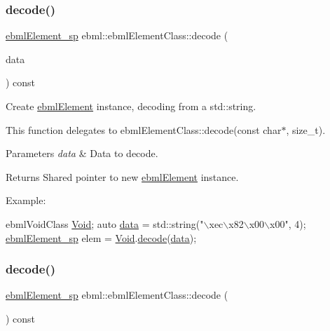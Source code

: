 \subsubsection{\texorpdfstring{decode()}{decode()}\hspace{0.1cm}{\footnotesize\ttfamily [4/10]}}
{\footnotesize\ttfamily \mbox{\hyperlink{namespaceebml_adad533b7705a16bb360fe56380c5e7be}{ebml\+Element\+\_\+sp}} ebml\+::ebml\+Element\+Class\+::decode (\begin{DoxyParamCaption}\item[{const std\+::string \&}]{data }\end{DoxyParamCaption}) const}

Create \mbox{\hyperlink{classebml_1_1ebmlElement}{ebml\+Element}} instance, decoding from a std\+::string.

This function delegates to ebml\+Element\+Class\+::decode(const char$\ast$, size\+\_\+t).


\begin{DoxyParams}{Parameters}
{\em data} & Data to decode. \\
\hline
\end{DoxyParams}
\begin{DoxyReturn}{Returns}
Shared pointer to new \mbox{\hyperlink{classebml_1_1ebmlElement}{ebml\+Element}} instance.
\end{DoxyReturn}
Example\+: 
\begin{DoxyCode}
ebmlVoidClass \mbox{\hyperlink{namespaceebml_afbfd509d1cb71e416a07253746e886e9}{Void}};
\textcolor{keyword}{auto} \mbox{\hyperlink{namespaceebml_ab21f8b4ff85186f670f17e84a02d9740}{data}} = std::string(\textcolor{stringliteral}{"\(\backslash\)xec\(\backslash\)x82\(\backslash\)x00\(\backslash\)x00"}, 4);
\mbox{\hyperlink{namespaceebml_adad533b7705a16bb360fe56380c5e7be}{ebmlElement\_sp}} elem = \mbox{\hyperlink{namespaceebml_afbfd509d1cb71e416a07253746e886e9}{Void}}.\mbox{\hyperlink{classebml_1_1ebmlElementClass_a9de19726c4794e4e3cb1f32e445c5002}{decode}}(\mbox{\hyperlink{namespaceebml_ab21f8b4ff85186f670f17e84a02d9740}{data}});
\end{DoxyCode}
 \mbox{\label{classebml_1_1ebmlElementClass_ade81fc2a088d16f40474fd9885770f84}} 
\subsubsection{\texorpdfstring{decode()}{decode()}\hspace{0.1cm}{\footnotesize\ttfamily [5/10]}}
{\footnotesize\ttfamily \mbox{\hyperlink{namespaceebml_adad533b7705a16bb360fe56380c5e7be}{ebml\+Element\+\_\+sp}} ebml\+::ebml\+Element\+Class\+::decode (\begin{DoxyParamCaption}\item[{\mbox{\hyperlink{namespaceebml_a7bb59128ac6af27e47367938a846b569}{io\+Base\+\_\+sp}} \&}]{ }\end{DoxyParamCaption}) const}

